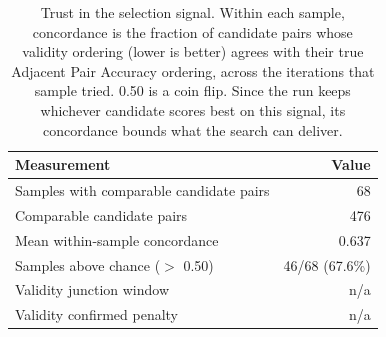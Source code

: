 \begin{table}[htbp]
  \centering
  \caption{Trust in the selection signal. Within each sample, concordance is the fraction of candidate pairs whose validity ordering (lower is better) agrees with their true Adjacent Pair Accuracy ordering, across the iterations that sample tried. 0.50 is a coin flip. Since the run keeps whichever candidate scores best on this signal, its concordance bounds what the search can deliver.}
  \label{tab:validity_concordance}
  \begin{tabular}{lr}
    \toprule
    Measurement & Value \\
    \midrule
    Samples with comparable candidate pairs & 68 \\
    Comparable candidate pairs & 476 \\
    Mean within-sample concordance & 0.637 \\
    Samples above chance ($>$ 0.50) & 46/68 (67.6\%) \\
    Validity junction window & n/a \\
    Validity confirmed penalty & n/a \\
    \bottomrule
  \end{tabular}
\end{table}
